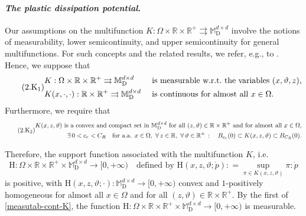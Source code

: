 \documentclass[a4paper,10pt,reqno]{amsart}
\numberwithin{equation}{section}
\newcommand{\bbM}{\mathbb{M}}
\newcommand{\R}{\mathbb{R}}
\numberwithin{equation}{section}
\newcommand{\teta}{\vartheta}
\newcommand{\foraa}{\text{for a.a. }}
\newcommand{\mt}{\bbM}
\newcommand{\dev}{\mathrm{D}}
\newcommand{\dipname}{\mathrm{H}}
\newcommand{\dipx}[4]{\mathrm{H}(#1,#2, #3;#4)}
\begin{document}
\paragraph{{\em The plastic dissipation potential}.}
Our  assumptions on the multifunction $K: \Omega \times \R \times  \R^+ \rightrightarrows \mt_\dev^{d \times d}$ involve the notions of measurability, lower semicontinuity, 
and upper semicontinuity  for general multifunctions. For such concepts and the related results, we refer, e.g., to 
  \cite{Castaing-Valadier77}. 
Hence,  we suppose that
\begin{equation}
\label{measutab-cont-K}
\tag{2.$\mathrm{K}_1$}
\begin{aligned}
&
K : \Omega \times \R \times   \R^+ \rightrightarrows \mt_\dev^{d \times d}  &&  \text{ is measurable w.r.t.\ the variables $(x,\teta,z)$,}
\\
&
K(x, \cdot,\cdot) : \R \times  \R^+ \rightrightarrows \mt_\dev^{d \times d}   && \text{ is continuous for almost all } x \in \Omega.
\end{aligned}
\end{equation}
Furthermore, we require that 
\begin{equation}
\label{elastic-domain}
\tag{2.$\mathrm{K}_2$}
\begin{aligned}
K(x,z,\teta) \text{ is a convex and compact set in }  \mt_\dev^{d \times d} \text{ for all } (z,\teta) \in \R \times  \R^+ \text{ and  for almost all } x \in \Omega,
\\
\exists\, 0<c_r<C_R \quad  \foraa x \in \Omega, \ \forall\, z \in \R, \  \forall\, \teta \in  \R^+ \, : \quad B_{c_r}(0) \subset  K(x,z,\teta) \subset B_{C_R}(0).
\end{aligned}
\end{equation}
\par
Therefore, the support function associated with the multifunction $K$, i.e.
\begin{equation}
\label{1-homogeneous-dissip}
\dipname: \Omega  \times \R \times  \R^+ \times  \mt_\dev^{d \times d} \to [0,+\infty) \quad \text{defined by } \dipx{x}z{\teta}{\dot p}: = \sup_{\pi \in K(x,z,\teta)} \pi : \dot p 
\end{equation}
is positive, with $\dipx{x}z{\teta}{ \cdot} :  \mt_\dev^{d \times d} \to   [0,+\infty)  $ convex and $1$-positively homogeneous for almost all $x \in \Omega$ and for all $(z,\teta) \in \R \times \R^+$. 
By the first of \eqref{measutab-cont-K},  the function $\dipname: \Omega \times \R  \times \R^+ \times  \mt_\dev^{d \times d} \to [0,+\infty) $ is measurable.
\end{document}

